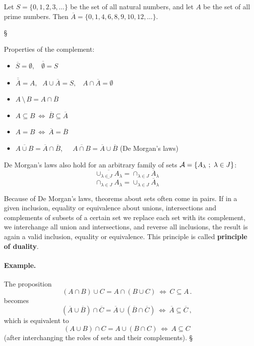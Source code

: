 \documentclass[11pt,paper=b5,footinclude,headinclude]{scrbook} %
\def\brez {{\,\setminus\,}}
\def\cee {{~\Leftrightarrow~}}
\def\kz{{\hfill{\S}}}%
\theoremstyle{remark}
\theoremstyle{definition} %
\theoremstyle{theorem} %
\begin{document}
Let $S = \{0,1,2,3,\ldots\}$ be the set of all natural numbers, and let $A$ be the set of all prime numbers.
Then $\overline A = \{0,1,4,6,8,9,10,12,\ldots\}$.

\kz

\medskip
Properties of the complement:
\begin{itemize}
  \item
$\overline S = \emptyset,~~~~\overline \emptyset = S$

  \item
$\overline{\overline A} = A,~~~A\cup \overline A = S,~~~~A\cap \overline A = \emptyset$

  \item
$A\brez B = A\cap \overline B$

  \item
$A\subseteq B \cee  \overline B \subseteq \overline A$

  \item
$A= B \cee  \overline A = \overline B$

  \item
$\overline{A\cup B} = \overline A\cap \overline B$,~~~$\overline{A\cap B} = \overline A\cup \overline B$ (De Morgan's laws)
\end{itemize}

De Morgan's laws also hold for an arbitrary family of sets ${\cal A} = \{A_\lambda~;~\lambda\in J\}$:
$$\overline{\cup_{\lambda\in J}A_\lambda} = {\cap_{\lambda\in J}\overline A_\lambda}$$
$$\overline{\cap_{\lambda\in J}A_\lambda} = {\cup_{\lambda\in J}\overline A_\lambda}$$

Because of De Morgan's laws, theorems about sets often come in pairs.
If in a given inclusion, equality or equivalence about unions, intersections and complements of  subsets of a certain set we replace each set with its complement, we interchange all union and intersections, and reverse all inclusions, the result is again a valid inclusion, equality or equivalence. This principle is called \textbf{ principle of duality}.

\bigskip
\paragraph{Example.}

The proposition
$$(A\cap B)\cup C = A\cap (B\cup C) \cee C\subseteq A\,.$$
becomes
$$(\overline A\cup \overline B)\cap \overline C = \overline A\cup (\overline B\cap \overline C) \cee \overline A\subseteq \overline C\,,$$
which is equivalent to
$$(A\cup B)\cap C = A\cup (B\cap C) \cee A\subseteq C$$
(after interchanging the roles of sets and their complements).
\kz
\end{document}
